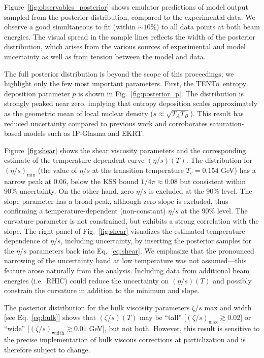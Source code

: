 \documentclass[3p,times,procedia,sort&compress]{elsarticle}
\newcommand{\trento}{T\raisebox{-0.5ex}{R}ENTo}
\begin{document}
Figure~\ref{fig:observables_posterior} shows emulator predictions of model output sampled from the posterior distribution, compared to the experimental data.
We observe a good simultaneous to fit (within ${\sim}10\%$) to all data points at both beam energies.
The visual spread in the sample lines reflects the width of the posterior distribution, which arises from the various sources of experimental and model uncertainty as well as from tension between the model and data.

The full posterior distribution is beyond the scope of this proceedings;
we highlight only the few most important parameters.
First, the \trento\ entropy deposition parameter $p$ is shown in Fig.~\ref{fig:posterior_p}.
The distribution is strongly peaked near zero, implying that entropy deposition scales approximately as the geometric mean of local nuclear density ($s \approx \sqrt{T_AT_B}$).
This result has reduced uncertainty compared to previous work and corroborates saturation-based models such as IP-Glasma and EKRT.

Figure~\ref{fig:shear} shows the shear viscosity parameters and the corresponding estimate of the temperature-dependent curve $(\eta/s)(T)$.
The distribution for $(\eta/s)_\text{min}$ (the value of $\eta/s$ at the transition temperature $T_c = 0.154$ GeV) has a narrow peak at 0.06, below the KSS bound $1/4\pi \approx 0.08$ but consistent within 90\% uncertainty.
On the other hand, zero $\eta/s$ is excluded at the 90\% level.
The slope parameter has a broad peak, although zero slope is excluded, thus confirming a temperature-dependent (non-constant) $\eta/s$ at the 90\% level.
The curvature parameter is not constrained, but exhibits a strong correlation with the slope.
The right panel of Fig.~\ref{fig:shear} visualizes the estimated temperature dependence of $\eta/s$, including uncertainty, by inserting the posterior samples for the $\eta/s$ parameters back into Eq.~\ref{eq:shear}.
We emphasize that the pronounced narrowing of the uncertainty band at low temperature was not assumed---this feature arose naturally from the analysis.
Including data from additional beam energies (i.e.\ RHIC) could reduce the uncertainty on $(\eta/s)(T)$ and possibly constrain the curvature in addition to the minimum and slope.

The posterior distribution for the bulk viscosity parameters $\zeta/s$ max and width [see Eq.~\eqref{eq:bulk}] shows that $(\zeta/s)(T)$ may be ``tall'' [$(\zeta/s)_\text{max} \gtrsim 0.02$] or ``wide'' [$(\zeta/s)_\text{width} \gtrsim 0.01$ GeV], but not both.
However, this result is sensitive to the precise implementation of bulk viscous corrections at particlization and is therefore subject to change.
\end{document}
